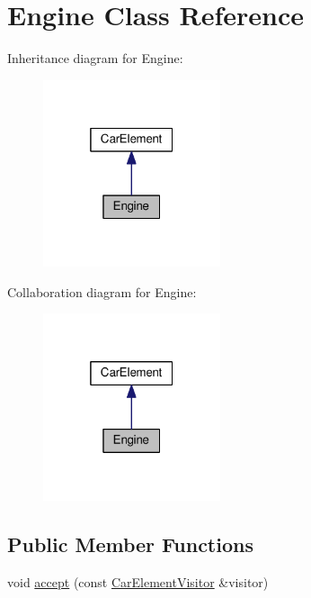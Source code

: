 \hypertarget{classEngine}{}\section{Engine Class Reference}
\label{classEngine}


Inheritance diagram for Engine\+:
\nopagebreak
\begin{figure}[H]
\begin{center}
\leavevmode
\includegraphics[width=148pt]{classEngine__inherit__graph}
\end{center}
\end{figure}


Collaboration diagram for Engine\+:
\nopagebreak
\begin{figure}[H]
\begin{center}
\leavevmode
\includegraphics[width=148pt]{classEngine__coll__graph}
\end{center}
\end{figure}
\subsection*{Public Member Functions}
\begin{DoxyCompactItemize}
\item 
void \hyperlink{classEngine_ade04196721865cbebc12c0d34ad2a3d5}{accept} (const \hyperlink{structCarElementVisitor}{Car\+Element\+Visitor} \&visitor)
\end{DoxyCompactItemize}


